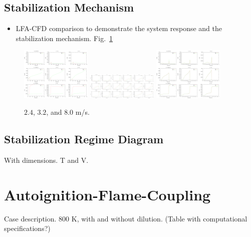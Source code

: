 \documentclass[11pt,english]{article}
\begin{document}
\subsection{Stabilization Mechanism}
\begin{itemize}
  \item LFA-CFD comparison to demonstrate the system response and the stabilization mechanism.  Fig.~\ref{fig:LFA_velocity}
\end{itemize}
\begin{figure}[t]
      \centering
      \scriptsize
      \includegraphics[width=0.3\textwidth]{2_4_profile_time.pdf}
      \includegraphics[trim = 0 0 305mm 0, clip, width=0.3\textwidth]{900_profile_time.pdf}
      \includegraphics[width=0.3\textwidth]{8_0_profile_time.pdf}
      \normalsize
      \caption{$2.4$, $3.2$, and $8.0$ m/s.}
      \label{fig:LFA_velocity}
    \end{figure} 

\subsection{Stabilization Regime Diagram}
With dimensions.  T and V.

\section{Autoignition-Flame-Coupling}
Case description.  $800$ K, with and without dilution.  (Table with computational specifications?)
\end{document}
